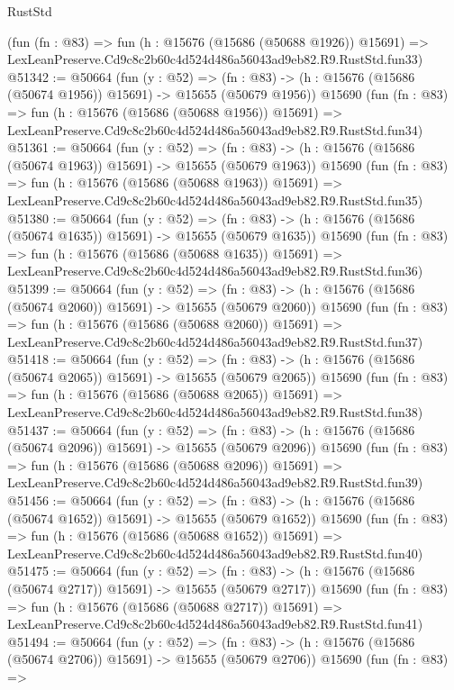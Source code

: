 \begin{lexlean}{RustStd}
\begin{coremodule}
    (fun (fn : @83) =>
    fun (h : @15676 (@15686 (@50688 @1926)) @15691) =>
    LexLeanPreserve.Cd9c8c2b60c4d524d486a56043ad9eb82.R9.RustStd.fun33)
@51342 := @50664
    (fun (y : @52) =>
    (fn : @83) -> (h : @15676 (@15686 (@50674 @1956)) @15691) -> @15655 (@50679 @1956))
    @15690
    (fun (fn : @83) =>
    fun (h : @15676 (@15686 (@50688 @1956)) @15691) =>
    LexLeanPreserve.Cd9c8c2b60c4d524d486a56043ad9eb82.R9.RustStd.fun34)
@51361 := @50664
    (fun (y : @52) =>
    (fn : @83) -> (h : @15676 (@15686 (@50674 @1963)) @15691) -> @15655 (@50679 @1963))
    @15690
    (fun (fn : @83) =>
    fun (h : @15676 (@15686 (@50688 @1963)) @15691) =>
    LexLeanPreserve.Cd9c8c2b60c4d524d486a56043ad9eb82.R9.RustStd.fun35)
@51380 := @50664
    (fun (y : @52) =>
    (fn : @83) -> (h : @15676 (@15686 (@50674 @1635)) @15691) -> @15655 (@50679 @1635))
    @15690
    (fun (fn : @83) =>
    fun (h : @15676 (@15686 (@50688 @1635)) @15691) =>
    LexLeanPreserve.Cd9c8c2b60c4d524d486a56043ad9eb82.R9.RustStd.fun36)
@51399 := @50664
    (fun (y : @52) =>
    (fn : @83) -> (h : @15676 (@15686 (@50674 @2060)) @15691) -> @15655 (@50679 @2060))
    @15690
    (fun (fn : @83) =>
    fun (h : @15676 (@15686 (@50688 @2060)) @15691) =>
    LexLeanPreserve.Cd9c8c2b60c4d524d486a56043ad9eb82.R9.RustStd.fun37)
@51418 := @50664
    (fun (y : @52) =>
    (fn : @83) -> (h : @15676 (@15686 (@50674 @2065)) @15691) -> @15655 (@50679 @2065))
    @15690
    (fun (fn : @83) =>
    fun (h : @15676 (@15686 (@50688 @2065)) @15691) =>
    LexLeanPreserve.Cd9c8c2b60c4d524d486a56043ad9eb82.R9.RustStd.fun38)
@51437 := @50664
    (fun (y : @52) =>
    (fn : @83) -> (h : @15676 (@15686 (@50674 @2096)) @15691) -> @15655 (@50679 @2096))
    @15690
    (fun (fn : @83) =>
    fun (h : @15676 (@15686 (@50688 @2096)) @15691) =>
    LexLeanPreserve.Cd9c8c2b60c4d524d486a56043ad9eb82.R9.RustStd.fun39)
@51456 := @50664
    (fun (y : @52) =>
    (fn : @83) -> (h : @15676 (@15686 (@50674 @1652)) @15691) -> @15655 (@50679 @1652))
    @15690
    (fun (fn : @83) =>
    fun (h : @15676 (@15686 (@50688 @1652)) @15691) =>
    LexLeanPreserve.Cd9c8c2b60c4d524d486a56043ad9eb82.R9.RustStd.fun40)
@51475 := @50664
    (fun (y : @52) =>
    (fn : @83) -> (h : @15676 (@15686 (@50674 @2717)) @15691) -> @15655 (@50679 @2717))
    @15690
    (fun (fn : @83) =>
    fun (h : @15676 (@15686 (@50688 @2717)) @15691) =>
    LexLeanPreserve.Cd9c8c2b60c4d524d486a56043ad9eb82.R9.RustStd.fun41)
@51494 := @50664
    (fun (y : @52) =>
    (fn : @83) -> (h : @15676 (@15686 (@50674 @2706)) @15691) -> @15655 (@50679 @2706))
    @15690
    (fun (fn : @83) =>

\end{coremodule}
\end{lexlean}
